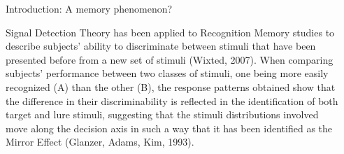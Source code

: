 \documentclass[final]{beamer}
\newlength{\sepwid}
\newlength{\onecolwid}
\begin{document}
\begin{frame}[t]


\begin{columns}[t] %
\begin{column}{\sepwid}\end{column} %
\begin{column}{\onecolwid} %


\begin{alertblock}{Introduction: A memory phenomenon?}

Signal Detection Theory has been applied to Recognition Memory studies to describe subjects’ ability to discriminate between stimuli that have been presented before from a new set of stimuli (Wixted, 2007). When comparing subjects' performance between two classes of stimuli, one being more easily recognized (A) than the other (B), the response patterns obtained show that the difference in their discriminability is reflected in the identification of both target and lure stimuli, suggesting that the stimuli distributions involved move along the decision axis in such a way that it has been identified as the Mirror Effect (Glanzer, Adams, Kim, 1993).



\end{alertblock}
\end{column}
\end{columns}
\end{frame}
\end{document}
